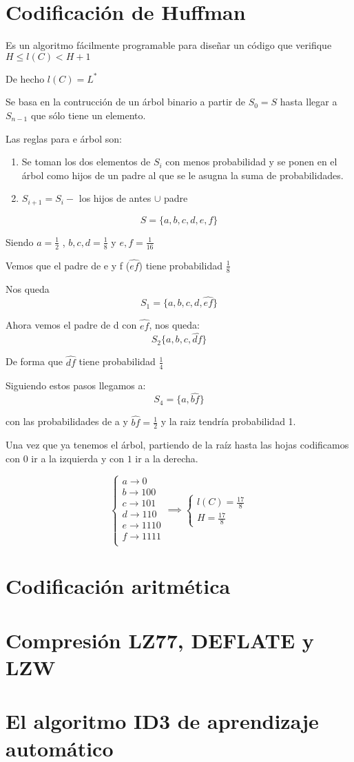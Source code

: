 \section{Codificación de Huffman}

Es un algoritmo fácilmente programable para diseñar un código que verifique $H \leq l(C) < H +1$

De hecho $l(C) = L^{*}$

Se basa en la contrucción de un árbol binario a partir de $S_0 = S$ hasta llegar a $S_{n-1}$ que sólo tiene un elemento.

Las reglas para e árbol son:
\begin{enumerate}
	\item Se toman los dos elementos de $S_i$ con menos probabilidad y se ponen en el árbol como hijos de un padre al que se le asugna la suma de probabilidades.
	\item $S_{i+1} = S_i - $ {los hijos de antes} $\cup$ {padre}
\end{enumerate}
\begin{example}
	$$S =\{ a, b , c, d, e , f \}$$
	
	Siendo $a = \frac{1}{2}$ , $b, c,d = \frac{1}{8}$ y $e, f = \frac{1}{16}$
	
	Vemos que el padre de e y f ($\widehat{ef}$) tiene probabilidad $\frac{1}{8}$
	
	Nos queda
	$$S_1 = \{a,b,c,d,\widehat{ef}\}$$
	
	
	Ahora vemos el padre de d con $\widehat{ef}$, nos queda:
	$$S_2\{ a, b,c,\widehat{df}\}$$
	
	De forma que $\widehat{df}$ tiene probabilidad $\frac{1}{4}$
	
	Siguiendo estos pasos llegamos a:
	$$S_4 = \{ a , \widehat{bf}\}$$
	
	con las probabilidades de a y $\widehat{bf} = \frac{1}{2}$ y la raiz tendría probabilidad 1.
	
	Una vez que ya tenemos el árbol, partiendo de la raíz hasta las hojas codificamos con $0$ ir a la izquierda y con $1$ ir a la derecha.
	
	$$\begin{cases}
	a \rightarrow 0 \\
	b \rightarrow 100 \\
	c \rightarrow 101 \\
	d \rightarrow 110 \\
	e \rightarrow 1110 \\
	f \rightarrow 1111 \\
	\end{cases} \implies \begin{cases}
	l(C) = \frac{17}{8}\\
	H = \frac{17}{8}
	\end{cases}$$ 
\end{example}

\section{Codificación aritmética}
\section{Compresión LZ77, DEFLATE y LZW}
\section{El algoritmo ID3 de aprendizaje automático}

